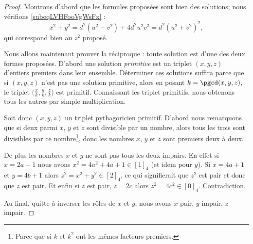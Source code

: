 \begin{proof}
    Montrons d'abord que les formules proposées sont bien des solutions; nous vérifions \eqref{subeqLVHFooVgWsFx} :
    \begin{equation}
        x^2+y^2=d^2(u^2-v^2)+4d^2u^2v^2=d^2(u^2+v^2)^2,
    \end{equation}
    qui correspond bien au \( z^2\) proposé.

    Nous allons maintenant prouver la réciproque : toute solution est d'une des deux formes proposées. D'abord une solution \emph{primitive} est un triplet \( (x,y,z)\) d'entiers premiers dans leur ensemble. Déterminer ces solutions suffira parce que si \( (x,y,z)\) n'est pas une solution primitive, alors en posant \( k=\pgcd(x,y,z)\), le triplet \( \big( \frac{ x }{ k },\frac{ y }{ k },\frac{ z }{ k } \big)\) est primitif. Connaissant les triplet primitifs, nous obtenons tous les autres par simple multiplication.

    Soit donc \( (x,y,z)\) un triplet pythagoricien primitif. D'abord nous remarquons que si deux parmi \( x\), \( y\) et \( z\) sont divisible par un nombre, alors tous les trois sont divisibles par ce nombre\footnote{Parce que si \( k\) et \( k^2\) ont les mêmes facteurs premiers.}, donc les nombres \( x\), \( y\) et \( z\) sont premiers deux à deux.

    De plus les nombres \( x\) et \( y\) ne sont pas tous les deux impairs. En effet si \( x=2a+1\) nous avons \( x^2=4a^2+4a+1\in [1]_4\) (et idem pour \( y\)). Si \( x=4a+1\) et \( y=4b+1\) alors \( z^2=x^2+y^2\in [2]_4\), ce qui signifierait que \( z^2\) est pair et donc que \( z\) est pair. Et enfin si \( z\) est pair, \( z=2c\) alors \( z^2=4c^2\in [0]_4\). Contradiction. 

    Au final, quitte à inverser les rôles de \( x\) et \( y\), nous avons \( x\) pair, \( y\) impair, \( z\) impair.


\end{proof}
